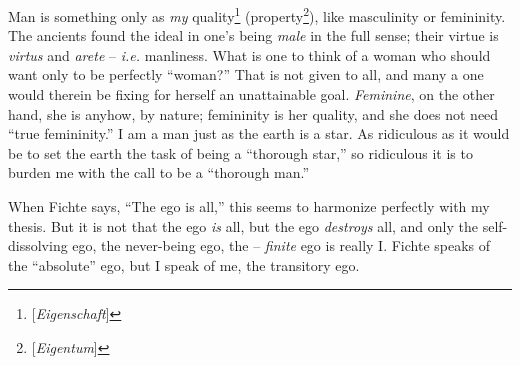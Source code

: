 Man is something only as \textit{my} quality\footnote{[\textit{Eigenschaft}]} 
(property\footnote{[\textit{Eigentum}]}), like masculinity or femininity. The 
ancients found the ideal in one's being \textit{male} in the full sense; their 
virtue is \textit{virtus} and \textit{arete} -- \textit{i.e.} manliness. What 
is one to think of a woman who should want only to be perfectly ``woman?'' 
That is not given to all, and many a one would therein be fixing for herself 
an unattainable goal. \textit{Feminine}, on the other hand, she is anyhow, by 
nature; femininity is her quality, and she does not need ``true 
femininity.'' I am a man just as the earth is a star. As ridiculous as it 
would be to set the earth the task of being a ``thorough star,'' so 
ridiculous it is to burden me with the call to be a ``thorough man.''

When Fichte says, ``The ego is all,'' this seems to harmonize perfectly with 
my thesis. But it is not that the ego \textit{is} all, but the ego 
\textit{destroys} all, and only the self-dissolving ego, the never-being ego, 
the -- \textit{finite} ego is really I. Fichte speaks of the ``absolute'' 
ego, but I speak of me, the transitory ego.

